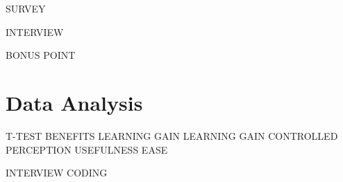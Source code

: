 SURVEY

INTERVIEW

BONUS POINT

\section{Data Analysis}


T-TEST
    BENEFITS
        LEARNING GAIN
        LEARNING GAIN CONTROLLED
    PERCEPTION
        USEFULNESS
        EASE

INTERVIEW
    CODING
